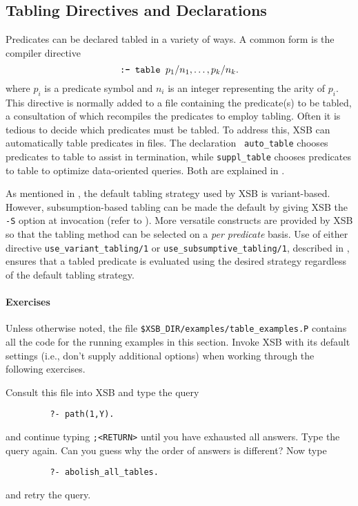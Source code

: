 
\subsection{Tabling Directives and Declarations}
\label{sec:TablingDirAndDecl}

Predicates can be declared tabled in a variety of ways.  A common form
is the compiler directive
\[
	\verb|:- table | p_1/n_1, \ldots, p_k/n_k.
\]
where $p_i$ is a predicate symbol and $n_i$ is an integer representing
the arity of $p_i$.  This directive is normally added to a file
containing the predicate(s) to be tabled, a consultation of which
recompiles the predicates to employ tabling.  Often it is tedious to
decide which predicates must be tabled.  To address this, XSB can
automatically table predicates in files.  The declaration {\tt
auto\_table} chooses predicates to table to
assist in termination, while {\tt suppl\_table} chooses predicates to table to optimize data-oriented
queries.  Both are explained in .

 As mentioned in
, the default tabling strategy used by
XSB is variant-based.  However, subsumption-based tabling can be made
the default by giving XSB the \verb|-S| option at invocation (refer to
).  More versatile constructs are provided by
XSB so that the tabling method can be selected on a \emph{per
predicate} basis.  Use of either directive
\texttt{use\_variant\_tabling/1}
or \texttt{use\_subsumptive\_tabling/1}, described in
, ensures that a tabled predicate is
evaluated using the desired strategy regardless of the default tabling
strategy.


\paragraph{Exercises}
Unless otherwise noted, the file
\textup{\texttt{\$XSB\_DIR/examples/table\_examples.P}} contains all
the code for the running examples in this section.  Invoke XSB with its
default settings (i.e., don't supply additional options) when working
through the following exercises.
\begin{exercise}
Consult this file into XSB and type the query
\begin{verbatim}
         ?- path(1,Y).
\end{verbatim}
and continue typing \verb|;<RETURN>| until you have exhausted all
answers.  Type the query again.  Can you guess why the order of
answers is different?  Now type
\begin{verbatim}
         ?- abolish_all_tables.
\end{verbatim}
and retry the  query.\fillBox
\end{exercise}

